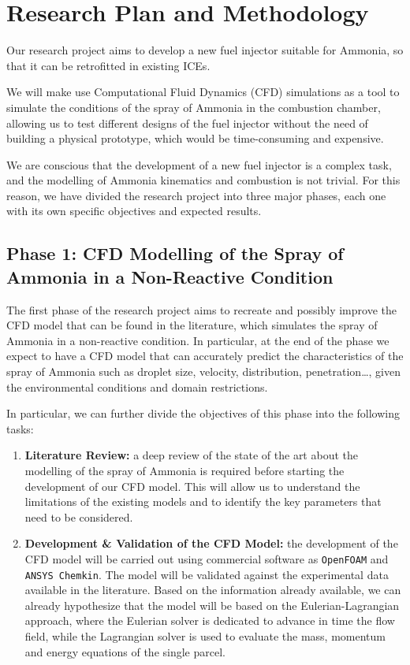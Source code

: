 \section{Research Plan and Methodology}
\label{sec:research_plan_and_methodology}

Our research project aims to develop a new fuel injector suitable for Ammonia, so that it can be retrofitted in existing ICEs.

We will make use Computational Fluid Dynamics (CFD) simulations as a tool to simulate the conditions of the spray of Ammonia in the combustion chamber, allowing us to test different designs of the fuel injector without the need of building a physical prototype, which would be time-consuming and expensive.

We are conscious that the development of a new fuel injector is a complex task, and the modelling of Ammonia kinematics and combustion is not trivial.
For this reason, we have divided the research project into three major phases, each one with its own specific objectives and expected results.

\subsection{Phase 1: CFD Modelling of the Spray of Ammonia in a Non-Reactive Condition}

The first phase of the research project aims to recreate and possibly improve the CFD model that can be found in the literature, which simulates the spray of Ammonia in a non-reactive condition.
In particular, at the end of the phase we expect to have a CFD model that can accurately predict the characteristics of the spray of Ammonia such as droplet size, velocity, distribution, penetration\dots, given the environmental conditions and domain restrictions.

In particular, we can further divide the objectives of this phase into the following tasks:

\begin{enumerate}
    \item \textbf{Literature Review:} a deep review of the state of the art about the modelling of the spray of Ammonia is required before starting the development of our CFD model. This will allow us to understand the limitations of the existing models and to identify the key parameters that need to be considered.
    \item \textbf{Development \& Validation of the CFD Model:} the development of the CFD model will be carried out using commercial software as \texttt{OpenFOAM} and \texttt{ANSYS Chemkin}. The model will be validated against the experimental data available in the literature. Based on the information already available, we can already hypothesize that the model will be based on the Eulerian-Lagrangian approach, where the Eulerian solver is dedicated to advance in time the flow field, while the Lagrangian solver is used to evaluate the mass, momentum and energy equations of the single parcel\footnotemark[2].
\end{enumerate}

